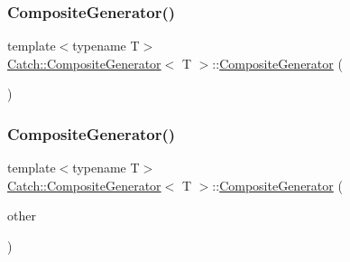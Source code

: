 \subsubsection{\texorpdfstring{Composite\+Generator()}{CompositeGenerator()}\hspace{0.1cm}{\footnotesize\ttfamily [1/2]}}
{\footnotesize\ttfamily template$<$typename T$>$ \\
\hyperlink{class_catch_1_1_composite_generator}{Catch\+::\+Composite\+Generator}$<$ T $>$\+::\hyperlink{class_catch_1_1_composite_generator}{Composite\+Generator} (\begin{DoxyParamCaption}{ }\end{DoxyParamCaption})\hspace{0.3cm}{\ttfamily [inline]}}

\hypertarget{class_catch_1_1_composite_generator_a21a7070a00e4a6fe021294c356692692}{}\label{class_catch_1_1_composite_generator_a21a7070a00e4a6fe021294c356692692} 
\subsubsection{\texorpdfstring{Composite\+Generator()}{CompositeGenerator()}\hspace{0.1cm}{\footnotesize\ttfamily [2/2]}}
{\footnotesize\ttfamily template$<$typename T$>$ \\
\hyperlink{class_catch_1_1_composite_generator}{Catch\+::\+Composite\+Generator}$<$ T $>$\+::\hyperlink{class_catch_1_1_composite_generator}{Composite\+Generator} (\begin{DoxyParamCaption}\item[{\hyperlink{class_catch_1_1_composite_generator}{Composite\+Generator}$<$ T $>$ \&}]{other }\end{DoxyParamCaption})\hspace{0.3cm}{\ttfamily [inline]}}

\hypertarget{class_catch_1_1_composite_generator_a5766205abd7004c508c20ddbb5e5555e}{}\label{class_catch_1_1_composite_generator_a5766205abd7004c508c20ddbb5e5555e} 
